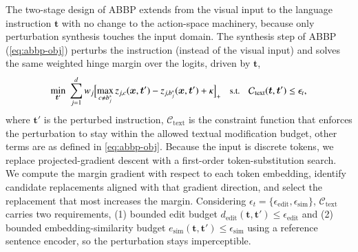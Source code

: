 \documentclass[11pt,letterpaper]{article}
\begin{document}
The two-stage design of ABBP extends from the visual input to the language instruction $\bm{t}$ with no change to the action-space machinery, because only perturbation synthesis touches the input domain.
The synthesis step of ABBP (\autoref{eq:abbp-obj}) perturbs the instruction (instead of the visual input) and solves the same weighted hinge margin over the logits, driven by $\bm{t}$,
\vspace{-1.5ex}\begin{equation}
  \small
\min_{\bm{t}'}\;\sum_{j=1}^{d} w_j
\Bigl[\max_{c\neq b_j^{*}} z_{j,c}(\bm{x},\bm{t}')-z_{j,b_j^{*}}(\bm{x},\bm{t}')+\kappa\Bigr]_{+}
\quad\text{s.t.}\quad
\mathcal{C}_{\mathrm{text}}(\bm{t},\bm{t}')\le\epsilon_t,
\label{eq:abbp-obj-text}
\vspace{-1.5ex}\end{equation}
where $\bm{t}'$ is the perturbed instruction, $\mathcal{C}_{\mathrm{text}}$ is the constraint function that enforces the perturbation to stay within the allowed textual modification budget, other terms are as defined in \autoref{eq:abbp-obj}.
Because the input is discrete tokens, we replace projected-gradient descent with a first-order token-substitution search. We compute the margin gradient with respect to each token embedding, identify candidate replacements aligned with that gradient direction, and select the replacement that most increases the margin.
Considering $\epsilon_t=\{\epsilon_{\mathrm{edit}},\epsilon_{\mathrm{sim}}\}$, $\mathcal{C}_{\mathrm{text}}$ carries two requirements, (1) bounded edit budget $d_{\mathrm{edit}}(\bm{t},\bm{t}')\le \epsilon_{\mathrm{edit}}$ and (2) bounded embedding-similarity budget $e_{\mathrm{sim}}(\bm{t},\bm{t}')\le \epsilon_{\mathrm{sim}}$ using a reference sentence encoder, so the perturbation stays imperceptible.
\end{document}
